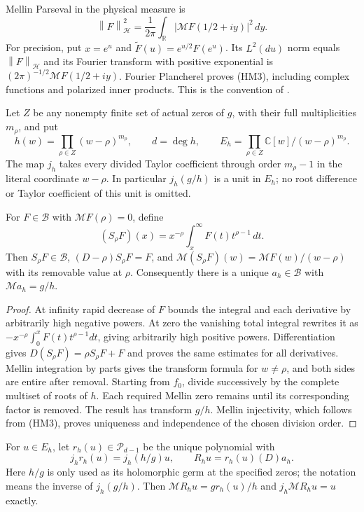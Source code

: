 \documentclass[11pt]{article}
\newcommand{\C}{\mathbb C}\newcommand{\R}{\mathbb R}
\newcommand{\B}{\mathscr B}\newcommand{\M}{\mathcal M}
\newcommand{\PP}{\mathcal P}\newcommand{\Hh}{\mathcal H}
\newcommand{\norm}[1]{\left\lVert#1\right\rVert}
\begin{document}
Mellin Parseval in the physical measure is
\begin{equation}\tag{HM3}
 \norm F_{\Hh}^2=\frac1{2\pi}\int_\R
                   |\M F(1/2+iy)|^2\,dy .
\end{equation}
For precision, put $x=e^u$ and $\widetilde F(u)=e^{u/2}F(e^u)$.
Its $L^2(du)$ norm equals $\norm F_{\Hh}$ and its Fourier transform
with positive exponential is $(2\pi)^{-1/2}\M F(1/2+iy)$.
Fourier Plancherel proves (HM3), including complex functions and polarized
inner products. This is the convention of \cite[\S1.14(iv)]{DLMF1}.

Let $Z$ be any nonempty finite set of actual zeros of $g$, with their
full multiplicities $m_\rho$, and put
\begin{equation}\tag{HM4}
 h(w)=\prod_{\rho\in Z}(w-\rho)^{m_\rho},\qquad d=\deg h,\qquad
 E_h=\prod_{\rho\in Z}\C[w]/(w-\rho)^{m_\rho}.
\end{equation}
The map $j_h$ takes every divided Taylor coefficient through order
$m_\rho-1$ in the literal coordinate $w-\rho$. In particular
$j_h(g/h)$ is a unit in $E_h$; no root difference or Taylor coefficient
of this unit is omitted.

\begin{lemma}
For $F\in\B$ with $\M F(\rho)=0$, define
\[
 (S_\rho F)(x)=x^{-\rho}\int_x^\infty F(t)t^{\rho-1}\,dt.
\]
Then $S_\rho F\in\B$,
$(D-\rho)S_\rho F=F$, and
$\M(S_\rho F)(w)=\M F(w)/(w-\rho)$ with its removable value at $\rho$.
Consequently there is a unique $a_h\in\B$ with $\M a_h=g/h$.
\end{lemma}
\begin{proof}
At infinity rapid decrease of $F$ bounds the integral and each derivative
by arbitrarily high negative powers. At zero the vanishing total integral
rewrites it as $-x^{-\rho}\int_0^xF(t)t^{\rho-1}dt$, giving arbitrarily
high positive powers. Differentiation gives
$D(S_\rho F)=\rho S_\rho F+F$ and proves the same estimates for all
derivatives. Mellin integration by parts gives the transform formula for
$w\ne\rho$, and both sides are entire after removal. Starting from
$f_0$, divide successively by the complete multiset of roots of $h$.
Each required Mellin zero remains until its corresponding factor is
removed. The result has transform $g/h$. Mellin injectivity, which
follows from (HM3), proves uniqueness and independence of the chosen
division order.
\end{proof}

For $u\in E_h$, let $r_h(u)\in\PP_{d-1}$ be the unique polynomial with
\begin{equation}\tag{HM5}
 j_h r_h(u)=j_h(h/g)u,
 \qquad R_hu=r_h(u)(D)a_h.
\end{equation}
Here $h/g$ is only used as its holomorphic germ at the specified zeros;
the notation means the inverse of $j_h(g/h)$. Then
$\M R_hu=g r_h(u)/h$ and $j_h\M R_hu=u$ exactly.
\end{document}
